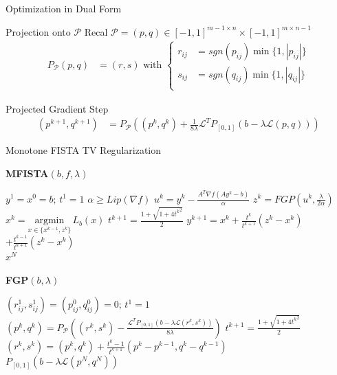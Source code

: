 \documentclass[12pt]{beamer}
\begin{document}
\begin{frame}{Optimization in Dual Form}

\begin{exampleblock}{Projection onto $\mathcal{P}$}
Recal $\mathcal{P} = (p,q) \in [-1,1]^{m-1 \times n}\times[-1,1]^{m \times n-1}$
\begin{align*}
P_\mathcal{P}(p,q) &= (r,s) \text{ with } \left\{ \begin{aligned}
r_{ij} &= sgn(p_{ij} ) \min \{ 1, |p_{ij}| \}\\
s_{ij} &= sgn(q_{ij} ) \min \{ 1, |q_{ij}| \}\\
\end{aligned}\right.
\end{align*}
\end{exampleblock}

\begin{exampleblock}{Projected Gradient Step}
\begin{align*}
(p^{k+1},q^{k+1} ) &= P_\mathcal{P} \left((p^k, q^k) + \frac{1}{8\lambda} \mathcal{L}^TP_{[0,1]} (b - \lambda \mathcal{L}(p,q)) \right)
\end{align*}
\end{exampleblock}

\end{frame}

\begin{frame}{Monotone FISTA TV Regularization}
\begin{spacing}{1.6}
\fontsize{9}{10}\selectfont
\hspace{-3 mm}
\begin{minipage}{0.4\textwidth}
\textbf{MFISTA$(b,f, \lambda)$}
\begin{algorithmic}
\State $y^1 = x^0 = b; \, t^1 = 1$
\State $\alpha \geq Lip(\nabla f)$
	\State $u^k = y^k - \frac{A^T\nabla f (A y^k - b)}{\alpha}$
	\State $z^k = FGP(u^k, \frac{\lambda}{2 \alpha})$
	\State $x^k = \underset{x \in \{x^{k-1},z^k\}}{\text{argmin}} \,L_b(x)$
	\State $t^{k+1} = \frac{1 + \sqrt{1 + 4{t^k}^2}}{2}$ 
	\State $y^{k+1} = x^k + \frac{t^k}{t^{k+1}}(z^k - x^k)$ 
	\State \hspace{10 mm}$+ \frac{t^{k-1}}{t^{k+1}}(z^k - x^k) $
\EndFor\\
\Return $x^N$
\end{algorithmic}
\end{minipage}
\begin{minipage}{0.6\textwidth}

\textbf{FGP$(b, \lambda)$}
\begin{algorithmic}
\State $(r_{ij}^1, s_{ij}^1) = (p_{ij}^0, q_{ij}^0) = 0; \, t^1 = 1$
	\State $(p^k,q^k) = P_\mathcal{P} \left( (r^k,s^k) - \frac{\mathcal{L}^TP_{[0,1]} (b - \lambda \mathcal{L}(r^k,s^k))}{8\lambda} \right)$
	\State $t^{k+1} = \frac{1 + \sqrt{1 + 4{t^k}^2}}{2}$ 
	\State $(r^k,s^k) = (p^k,q^k) + \frac{t^k-1}{t^{k+1}}(p^k-p^{k-1}, q^k-q^{k-1})$ 
\EndFor \\
\Return $P_{[0,1]} (b - \lambda \mathcal{L}(p^N,q^N))$
\end{algorithmic}

\end{minipage}
\end{spacing}
\end{frame}
\end{document}
